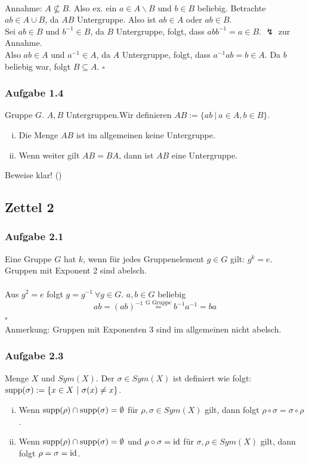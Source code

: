 \\
Annahme: $A\not\subseteq B$. Also ex. ein $a\in A\backslash B$ und $b\in B$ beliebig. Betrachte $ab\in A\cup B$, da $AB$ Untergruppe. Also ist $ab\in A$ oder $ab\in B$.\\
Sei $ab\in B$ und $b^{-1}\in B$, da $B$ Untergruppe, folgt, dass $abb^{-1}=a\in B$. $\lightning$ zur Annahme.\\
Also $ab\in A$ und $a^{-1}\in A$, da $A$ Untergruppe, folgt, dass $a^{-1}ab=b\in A$. Da $b$ beliebig war, folgt $B\subseteq A$.
\hfill $\square$

\subsubsection{Aufgabe 1.4}
Gruppe $G$. $A,B$ Untergruppen.Wir definieren $AB:=\{ab~|~a\in A,b \in B \}$.\\
\begin{enumerate}[(i)]
	\item Die Menge $AB$ ist im allgemeinen keine Untergruppe.
	\item Wenn weiter gilt $AB=BA$, dann ist $AB$ eine Untergruppe.
\end{enumerate}
Beweise klar! (\checkmark)

\subsection{Zettel 2}
\label{sub:zettel_2lga}
\subsubsection{Aufgabe 2.1}
Eine Gruppe $G$ hat  $k$, wenn für jedes Gruppenelement $g\in G$ gilt: $g^k=e$.\\
\zz Gruppen mit Exponent 2 sind abelsch.\\

\\
Aus $g^2=e$ folgt $g=g^{-1}~\forall g\in G$. $a,b\in G$ beliebig\\
\[ ab=(ab)^{-1}\stackrel{\text{G Gruppe}}{=} b^{-1}a^{-1}=ba \]
\hfill $\square$\\
Anmerkung: Gruppen mit Exponenten 3 sind im allgemeinen nicht abelsch.

\subsubsection{Aufgabe 2.3}
Menge $X$ und $Sym(X)$. Der  $\sigma \in Sym(X)$ ist definiert wie folgt: $\operatorname{supp}(\sigma):=\{x\in X~|~\sigma(x)\not=x \}$.
\begin{enumerate}[(i)]
	\item Wenn $\operatorname{supp}(\rho)\cap \operatorname{supp}(\sigma)=\emptyset$ für $\rho, \sigma \in Sym(X)$ gilt, dann folgt $\rho \circ \sigma=\sigma \circ \rho$.
	\item Wenn $\operatorname{supp}(\rho)\cap \operatorname{supp}(\sigma)=\emptyset$ und $\rho \circ \sigma=\operatorname{id}$ für $\sigma,\rho\in Sym(X)$ gilt, dann folgt $\rho=\sigma=\operatorname{id}$.
\end{enumerate}

